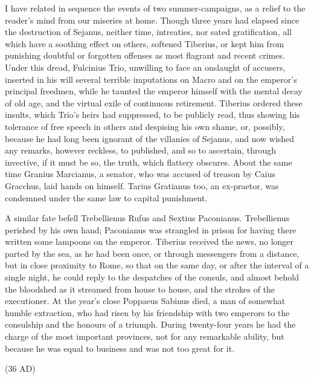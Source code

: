 I have related in sequence the events of two summer-campaigns, as a relief to the reader's mind from our miseries at home. Though three years had elapsed since the destruction of Sejanus, neither time, intreaties, nor sated gratification, all which have a soothing effect on others, softened Tiberius, or kept him from punishing doubtful or forgotten offenses as most flagrant and recent crimes. Under this dread, Fulcinius Trio, unwilling to face an onslaught of accusers, inserted in his will several terrible imputations on Macro and on the emperor's principal freedmen, while he taunted the emperor himself with the mental decay of old age, and the virtual exile of continuous retirement. Tiberius ordered these insults, which Trio's heirs had suppressed, to be publicly read, thus showing his tolerance of free speech in others and despising his own shame, or, possibly, because he had long been ignorant of the villanies of Sejanus, and now wished any remarks, however reckless, to published, and so to ascertain, through invective, if it must be so, the truth, which flattery obscures. About the same time Granius Marcianus, a senator, who was accused of treason by Caius Gracchus, laid hands on himself. Tarius Gratianus too, an ex-praetor, was condemned under the same law to capital punishment.


A similar fate befell Trebellienus Rufus and Sextius Paconianus. Trebellienus perished by his own hand; Paconianus was strangled in prison for having there written some lampoons on the emperor. Tiberius received the news, no longer parted by the sea, as he had been once, or through messengers from a distance, but in close proximity to Rome, so that on the same day, or after the interval of a single night, he could reply to the despatches of the consuls, and almost behold the bloodshed as it streamed from house to house, and the strokes of the executioner. At the year's close Poppaeus Sabinus died, a man of somewhat humble extraction, who had risen by his friendship with two emperors to the consulship and the honours of a triumph. During twenty-four years he had the charge of the most important provinces, not for any remarkable ability, but because he was equal to business and was not too great for it.


(36 AD)

